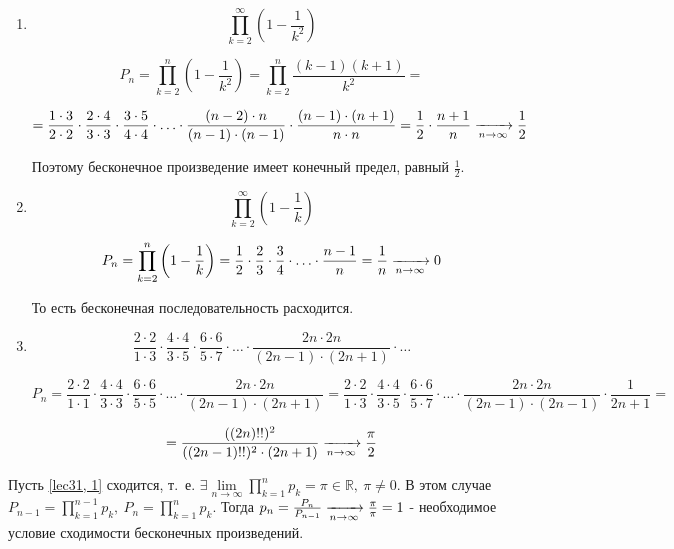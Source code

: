 \documentclass[../../main.tex]{subfiles}
\begin{document}
	\begin{example}
		\begin{enumerate}[label=\arabic*)]
			\item \[ \prod\limits_{k = 2}^{\infty} \left(1 - \frac{1}{k^2}\right) \]
			
			\[P_n = \prod\limits_{k = 2}^{n} \left(1 - \frac{1}{k^2}\right) = \prod\limits_{k = 2}^{n} \frac{(k - 1)(k + 1)}{k^2} = \]
			
			\[= \frac{1 \cdot 3}{2 \cdot 2} \cdot \frac{2 \cdot 4}{3 \cdot 3} \cdot \frac{3 \cdot 5}{4 \cdot 4} \cdot \ldots \cdot \frac{(n - 2) \cdot n}{(n - 1) \cdot (n - 1)} \cdot \frac{(n - 1) \cdot (n + 1)}{n \cdot n} = \frac{1}{2} \cdot \frac{n + 1}{n} \xrightarrow[n \to \infty]{} \frac{1}{2}\]
			
			Поэтому бесконечное произведение имеет конечный предел, равный $\frac{1}{2}$.
			
			\item  \[ \prod\limits_{k = 2}^{\infty} \left(1 - \frac{1}{k}\right) \]
			
			\[P_n = \prod\limits_{k = 2}^{n} \left(1 - \frac{1}{k}\right) = \frac{1}{2} \cdot \frac{2}{3} \cdot \frac{3}{4} \cdot \ldots \cdot \frac{n - 1}{n} = \frac{1}{n} \xrightarrow[n \to \infty]{} 0\]
			
			То есть бесконечная последовательность расходится.
			
			\item \[ \frac{2 \cdot 2}{1 \cdot 3} \cdot \frac{4 \cdot 4}{3 \cdot 5} \cdot \frac{6 \cdot 6}{5 \cdot 7} \cdot \ldots \cdot \frac{2n \cdot 2n}{(2n - 1) \cdot (2n + 1)} \cdot \ldots\]
			
			\[ P_n = \frac{2 \cdot 2}{1 \cdot 1} \cdot \frac{4 \cdot 4}{3 \cdot 3} \cdot \frac{6 \cdot 6}{5 \cdot 5} \cdot \ldots \cdot \frac{2n \cdot 2n}{(2n - 1) \cdot (2n + 1)} = \frac{2 \cdot 2}{1 \cdot 3} \cdot \frac{4 \cdot 4}{3 \cdot 5} \cdot \frac{6 \cdot 6}{5 \cdot 7} \cdot \ldots \cdot \frac{2n \cdot 2n}{(2n - 1) \cdot (2n - 1)} \cdot \frac{1}{2n + 1} = \]
			
			\[= \frac{((2n)!!)^2}{((2n - 1)!!)^2 \cdot (2n + 1)} \xrightarrow[n \to \infty]{} \frac{\pi}{2}\]
		\end{enumerate}
	\end{example}
	Пусть \eqref{lec31, 1} сходится, т.~е. $\exists \lim\limits_{n \to \infty} \prod\limits_{k = 1}^{n} p_k = \pi \in \mathbb{R},\ \pi \neq 0$. В этом случае $P_{n - 1} = \prod\limits_{k = 1}^{n - 1}p_k,\ P_{n} = \prod\limits_{k = 1}^{n}p_k$. Тогда $p_n = \frac{P_n}{P_{n - 1}} \xrightarrow[n \to \infty]{} \frac{\pi}{\pi} = 1$ - необходимое условие сходимости бесконечных произведений.
		
\end{document}
